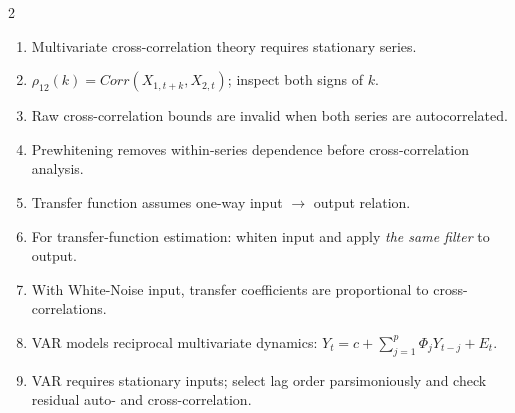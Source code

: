 \documentclass[9pt,a4paper]{extarticle}
\begin{document}
\begin{multicols}{2}
\begin{enumerate}
\item Multivariate cross-correlation theory requires stationary series.
\item \(\rho_{12}(k)=Corr(X_{1,t+k},X_{2,t})\); inspect both signs of \(k\).
\item Raw cross-correlation bounds are invalid when both series are autocorrelated.
\item Prewhitening removes within-series dependence before cross-correlation analysis.
\item Transfer function assumes one-way input \(\to\) output relation.
\item For transfer-function estimation: whiten input and apply \emph{the same filter} to output.
\item With White-Noise input, transfer coefficients are proportional to cross-correlations.
\item VAR models reciprocal multivariate dynamics: \(Y_t=c+\sum_{j=1}^p\Phi_jY_{t-j}+E_t\).
\item VAR requires stationary inputs; select lag order parsimoniously and check residual auto- and cross-correlation.
\end{enumerate}

\end{multicols}
\end{document}
